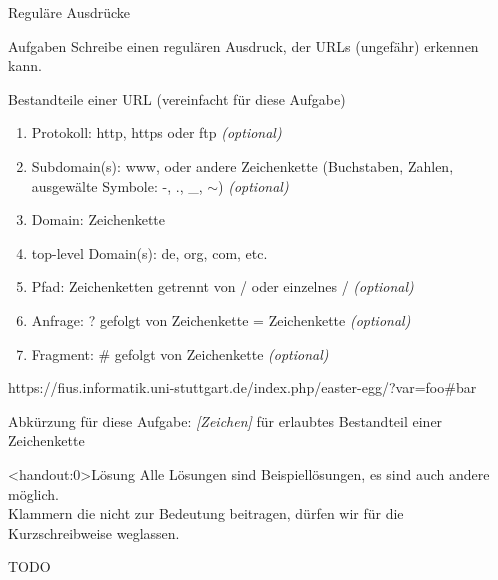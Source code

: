 {
	\begin{frame}{Reguläre Ausdrücke}
		\begin{alertblock}{Aufgaben}
			Schreibe einen regulären Ausdruck, der URLs (ungefähr) erkennen kann.
		\end{alertblock}
		\begin{block}{Bestandteile einer URL (vereinfacht für diese Aufgabe)}
			\begin{enumerate}
				\item \alert<2>{Protokoll}: http, https oder ftp \emph{(optional)}
				\item \alert<3>{Subdomain(s)}: www, oder andere Zeichenkette (Buchstaben, Zahlen, ausgewälte Symbole: -, ., \_, $\sim$) \emph{(optional)}
				\item \alert<4>{Domain}: Zeichenkette
				\item \alert<5>{top-level Domain(s)}: de, org, com, etc.
				\item \alert<6>{Pfad}: Zeichenketten getrennt von / oder einzelnes / \emph{(optional)}
				\item \alert<7>{Anfrage}: ? gefolgt von Zeichenkette = Zeichenkette \emph{(optional)}
				\item \alert<8>{Fragment}: \# gefolgt von Zeichenkette \emph{(optional)}
			\end{enumerate}
			\small{\alert<2>{https}://\alert<3>{fius}.\alert<3>{informatik}.\alert<4>{uni-stuttgart}.\alert<5>{de}\alert<6>{/index.php/easter-egg/}\alert<7>{?var=foo}\alert<8>{\#bar}}
		\end{block}
		\footnotesize{Abkürzung für diese Aufgabe: \emph{[Zeichen]} für erlaubtes Bestandteil einer Zeichenkette}
	\end{frame}
}

{
	\begin{frame}<handout:0>{Lösung}
		Alle Lösungen sind Beispiellösungen, es sind auch andere möglich.\\
		Klammern die nicht zur Bedeutung beitragen, dürfen wir für die Kurzschreibweise weglassen.
		
		TODO
		
	\end{frame}
}

%
%

